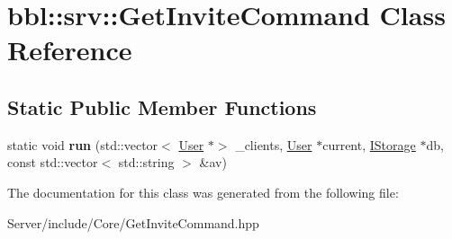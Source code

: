 \hypertarget{classbbl_1_1srv_1_1_get_invite_command}{}\section{bbl\+:\+:srv\+:\+:Get\+Invite\+Command Class Reference}
\label{classbbl_1_1srv_1_1_get_invite_command}
\subsection*{Static Public Member Functions}
\begin{DoxyCompactItemize}
\item 
\mbox{\label{classbbl_1_1srv_1_1_get_invite_command_a081c78fd4d4522ccb8b28efb3a388fb6}} 
static void {\bfseries run} (std\+::vector$<$ \hyperlink{classbbl_1_1srv_1_1_user}{User} $\ast$$>$ \+\_\+clients, \hyperlink{classbbl_1_1srv_1_1_user}{User} $\ast$current, \hyperlink{classbbl_1_1srv_1_1_i_storage}{I\+Storage} $\ast$db, const std\+::vector$<$ std\+::string $>$ \&av)
\end{DoxyCompactItemize}


The documentation for this class was generated from the following file\+:\begin{DoxyCompactItemize}
\item 
Server/include/\+Core/Get\+Invite\+Command.\+hpp\end{DoxyCompactItemize}
